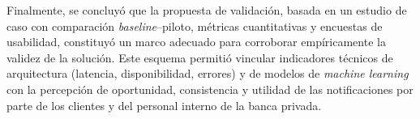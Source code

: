 \documentclass[conference]{IEEEtran}
\begin{document}
Finalmente, se concluy{\'o} que la propuesta de validaci{\'o}n, basada en un estudio de caso con comparaci{\'o}n \textit{baseline}--piloto, m{\'e}tricas cuantitativas y encuestas de usabilidad, constituy{\'o} un marco adecuado para corroborar emp{\'i}ricamente la validez de la soluci{\'o}n. Este esquema permiti{\'o} vincular indicadores t{\'e}cnicos de arquitectura (latencia, disponibilidad, errores) y de modelos de \textit{machine learning} con la percepci{\'o}n de oportunidad, consistencia y utilidad de las notificaciones por parte de los clientes y del personal interno de la banca privada.










\end{document}
